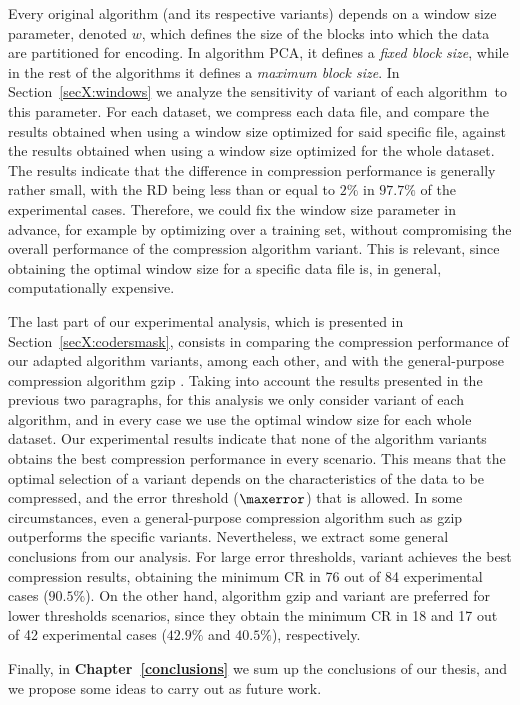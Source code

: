Every original algorithm (and its respective variants) depends on a window size parameter, denoted $w$, which defines the size of the blocks into which the data are partitioned for encoding. In algorithm PCA, it defines a \textit{fixed block size}, while in the rest of the algorithms it defines a \textit{maximum block size}. In Section~\ref{secX:windows} we analyze the sensitivity of variant \maskalgo of each algorithm\footSupportFocus\ to this parameter. For each dataset, we compress each data file, and compare the results obtained when using a window size optimized for said specific file, against the results obtained when using a window size optimized for the whole dataset. The results indicate that the difference in compression performance is generally rather small, with the RD being less than or equal to $2\%$ in $97.7\%$ of the experimental cases. Therefore, we could fix the window size parameter in advance, for example by optimizing over a training set, without compromising the overall performance of the compression algorithm variant. This is relevant, since obtaining the optimal window size for a specific data file is, in general, computationally expensive.


The last part of our experimental analysis, which is presented in Section~\ref{secX:codersmask}, consists in comparing the compression performance of our adapted algorithm variants, among each other, and with the general-purpose compression algorithm gzip \cite{gzip}. Taking into account the results presented in the previous two paragraphs, for this analysis we only consider variant \maskalgo of each algorithm, and in every case we use the optimal window size for each whole dataset. Our experimental results indicate that none of the algorithm variants obtains the best compression performance in every scenario. This means that the optimal selection of a variant depends on the characteristics of the data to be compressed, and the error threshold ($\maxerror$) that is allowed. In some circumstances, even a general-purpose compression algorithm such as gzip outperforms the specific variants. Nevertheless, we extract some general conclusions from our analysis. For large error thresholds, variant  achieves the best compression results, obtaining the minimum CR in 76 out of 84 experimental cases ($90.5\%$). On the other hand, algorithm gzip and variant  are preferred for lower thresholds scenarios, since they obtain the minimum CR in 18 and 17 out of 42 experimental cases ($42.9\%$ and $40.5\%$), respectively.


Finally, in \textbf{Chapter~\ref{conclusions}} we sum up the conclusions of our thesis, and we propose some ideas to carry out as future work.

